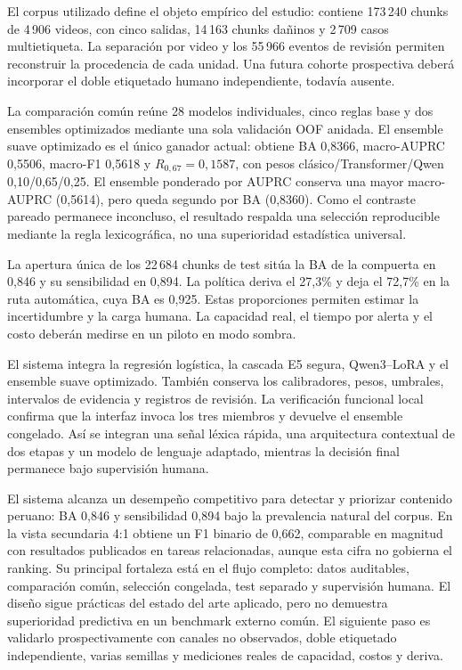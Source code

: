 El corpus utilizado define el objeto empírico del estudio: contiene 173\,240 chunks de 4\,906 videos, con cinco salidas, 14\,163 chunks dañinos y 2\,709 casos multietiqueta. La separación por video y los 55\,966 eventos de revisión permiten reconstruir la procedencia de cada unidad. Una futura cohorte prospectiva deberá incorporar el doble etiquetado humano independiente, todavía ausente.

La comparación común reúne 28 modelos individuales, cinco reglas base y dos ensembles optimizados mediante una sola validación OOF anidada. El ensemble suave optimizado es el único ganador actual: obtiene BA 0,8366, macro-AUPRC 0,5506, macro-F1 0,5618 y $R_{0,67}=0,1587$, con pesos clásico/Transformer/Qwen 0,10/0,65/0,25. El ensemble ponderado por AUPRC conserva una mayor macro-AUPRC (0,5614), pero queda segundo por BA (0,8360). Como el contraste pareado permanece inconcluso, el resultado respalda una selección reproducible mediante la regla lexicográfica, no una superioridad estadística universal.

La apertura única de los 22\,684 chunks de test sitúa la BA de la compuerta en 0,846 y su sensibilidad en 0,894. La política deriva el 27,3\% y deja el 72,7\% en la ruta automática, cuya BA es 0,925. Estas proporciones permiten estimar la incertidumbre y la carga humana. La capacidad real, el tiempo por alerta y el costo deberán medirse en un piloto en modo sombra.

El sistema integra la regresión logística, la cascada E5 segura, Qwen3--LoRA y el ensemble suave optimizado. También conserva los calibradores, pesos, umbrales, intervalos de evidencia y registros de revisión. La verificación funcional local confirma que la interfaz invoca los tres miembros y devuelve el ensemble congelado. Así se integran una señal léxica rápida, una arquitectura contextual de dos etapas y un modelo de lenguaje adaptado, mientras la decisión final permanece bajo supervisión humana.

El sistema alcanza un desempeño competitivo para detectar y priorizar contenido peruano: BA 0,846 y sensibilidad 0,894 bajo la prevalencia natural del corpus. En la vista secundaria 4:1 obtiene un F1 binario de 0,662, comparable en magnitud con resultados publicados en tareas relacionadas, aunque esta cifra no gobierna el ranking. Su principal fortaleza está en el flujo completo: datos auditables, comparación común, selección congelada, test separado y supervisión humana. El diseño sigue prácticas del estado del arte aplicado, pero no demuestra superioridad predictiva en un benchmark externo común. El siguiente paso es validarlo prospectivamente con canales no observados, doble etiquetado independiente, varias semillas y mediciones reales de capacidad, costos y deriva.

